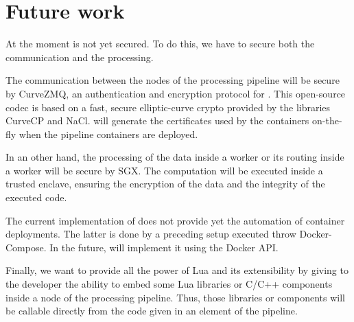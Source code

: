 \section{Future work}
\label{sec:future}



At the moment \SYS is not yet secured.
To do this, we have to secure both the communication and the processing.

The communication between the nodes of the processing pipeline will be secure by CurveZMQ\cite{zmq:curvezmq}, an authentication and encryption protocol for \zmq.
This open-source codec is based on a fast, secure elliptic-curve crypto provided by the libraries CurveCP\cite{zmq:curvecp} and NaCl\cite{zmq:nacl}.
\SYS will generate the certificates used by the containers on-the-fly when the pipeline containers are deployed.

In an other hand, the processing of the data inside a worker or its routing inside a worker will be secure by SGX.
The computation will be executed inside a trusted enclave, ensuring the encryption of the data and the integrity of the executed code.


The current implementation of \SYS does not provide yet the automation of container deployments.
The latter is done by a preceding setup executed throw Docker-Compose.
In the future, \SYS will implement it using the Docker API.


Finally, we want to provide all the power of Lua and its extensibility by giving to the developer the ability to embed some Lua libraries or C/C++ components inside a node of the processing pipeline.
Thus, those libraries or components will be callable directly from the code given in an element of the pipeline.
